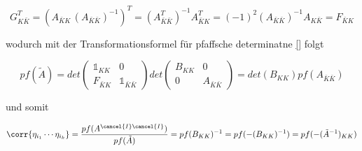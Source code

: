 \begin{equation}
G_{K \bar K}^T = (A_{\bar K K}\, (A_{\bar K \bar K})^{-1})^T =(A_{\bar K \bar K}^T)^{-1} A_{\bar K K}^T = (-1)^2 (A_{\bar K \bar K})^{-1} A_{K \bar K} = F_{\bar K K}
\end{equation}

wodurch mit der Transformationsformel für pfaffsche determinatne \eqref{} folgt

\begin{equation}
pf(\tilde A) = det
    \left(\begin{array}{cc} 
        \mathds{1}_{K K}      &  0 \\
        F_{\bar K K} &  \mathds{1}_{\bar K \bar K}
    \end{array}\right)
    det
    \left(\begin{array}{cc} 
        B_{K K}     &  0 \\
        0 &  A_{\bar K \bar K}
    \end{array}\right)
    =
    det(B_{K K}) pf( A_{\bar K \bar K})
\end{equation}

und somit 

\begin{equation}
\corr{\eta_{i_1} \cdots \eta_{i_k}}  = \frac{pf(A^{\cancel{I} \cancel{I}}) }{pf(\tilde A)} = pf(B_{K K})^{-1} = pf(-(B_{K K})^{-1}) = pf(-(\tilde A^{-1})_{K K}) 
\end{equation}


        

